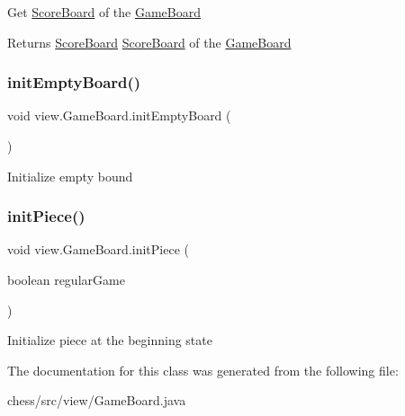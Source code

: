Get \mbox{\hyperlink{classview_1_1_score_board}{Score\+Board}} of the \mbox{\hyperlink{classview_1_1_game_board}{Game\+Board}} \begin{DoxyReturn}{Returns}
\mbox{\hyperlink{classview_1_1_score_board}{Score\+Board}} \mbox{\hyperlink{classview_1_1_score_board}{Score\+Board}} of the \mbox{\hyperlink{classview_1_1_game_board}{Game\+Board}} 
\end{DoxyReturn}
\mbox{\label{classview_1_1_game_board_aa30495f6887adc93e8b1fac7aee50b7a}} 
\subsubsection{\texorpdfstring{initEmptyBoard()}{initEmptyBoard()}}
{\footnotesize\ttfamily void view.\+Game\+Board.\+init\+Empty\+Board (\begin{DoxyParamCaption}{ }\end{DoxyParamCaption})\hspace{0.3cm}{\ttfamily [inline]}}

Initialize empty bound \mbox{\label{classview_1_1_game_board_aab3d1895eebf04e0053b64aa77abe5a3}} 
\subsubsection{\texorpdfstring{initPiece()}{initPiece()}}
{\footnotesize\ttfamily void view.\+Game\+Board.\+init\+Piece (\begin{DoxyParamCaption}\item[{boolean}]{regular\+Game }\end{DoxyParamCaption})\hspace{0.3cm}{\ttfamily [inline]}}

Initialize piece at the beginning state 

The documentation for this class was generated from the following file\+:\begin{DoxyCompactItemize}
\item 
chess/src/view/Game\+Board.\+java\end{DoxyCompactItemize}
